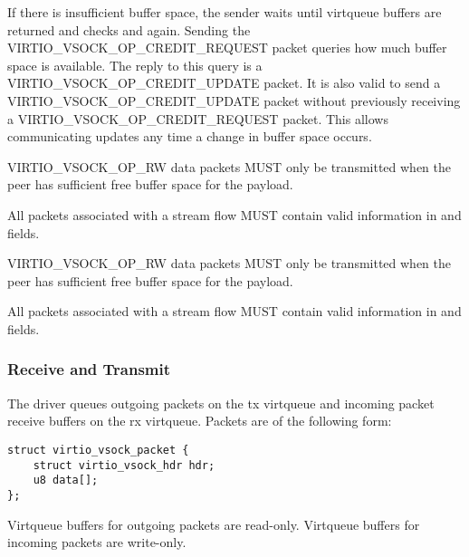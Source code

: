 If there is insufficient buffer space, the sender waits until virtqueue buffers
are returned and checks  and  again. Sending
the VIRTIO_VSOCK_OP_CREDIT_REQUEST packet queries how much buffer space is
available. The reply to this query is a VIRTIO_VSOCK_OP_CREDIT_UPDATE packet.
It is also valid to send a VIRTIO_VSOCK_OP_CREDIT_UPDATE packet without
previously receiving a VIRTIO_VSOCK_OP_CREDIT_REQUEST packet. This allows
communicating updates any time a change in buffer space occurs.

VIRTIO_VSOCK_OP_RW data packets MUST only be transmitted when the peer has
sufficient free buffer space for the payload.

All packets associated with a stream flow MUST contain valid information in
 and  fields.

VIRTIO_VSOCK_OP_RW data packets MUST only be transmitted when the peer has
sufficient free buffer space for the payload.

All packets associated with a stream flow MUST contain valid information in
 and  fields.

\subsubsection{Receive and Transmit}\label{sec:Device Types / Socket Device / Device Operation / Receive and Transmit}
The driver queues outgoing packets on the tx virtqueue and incoming packet
receive buffers on the rx virtqueue. Packets are of the following form:

\begin{lstlisting}
struct virtio_vsock_packet {
    struct virtio_vsock_hdr hdr;
    u8 data[];
};
\end{lstlisting}

Virtqueue buffers for outgoing packets are read-only. Virtqueue buffers for
incoming packets are write-only.

